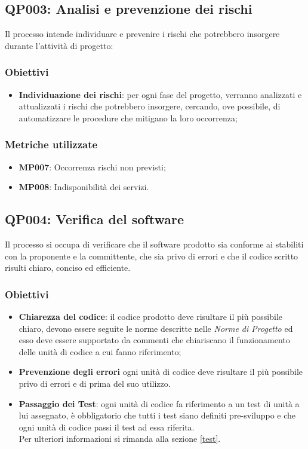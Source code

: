 \subsection{QP003: Analisi e prevenzione dei rischi}
Il processo intende individuare e prevenire i rischi che potrebbero insorgere durante l'attività di progetto:

\subsubsection{Obiettivi}
\begin{itemize}
	\item \textbf{Individuazione dei rischi}: per ogni fase del progetto, verranno analizzati e attualizzati i rischi che potrebbero insorgere, cercando, ove possibile, di automatizzare le procedure che mitigano la loro occorrenza;
\end{itemize}

\subsubsection{Metriche utilizzate}
\begin{itemize}	
	\item \textbf{MP007}: Occorrenza rischi non previsti;
	\item \textbf{MP008}: Indisponibilità dei servizi.
\end{itemize}
\subsection{QP004: Verifica del software}
Il processo si occupa di verificare che il software prodotto sia conforme ai  stabiliti con la proponente e la committente, che sia privo di errori e che il codice scritto risulti chiaro, conciso ed efficiente.
\subsubsection{Obiettivi}
\begin{itemize}
	\item \textbf{Chiarezza del codice}: il codice prodotto deve risultare il più possibile chiaro, devono essere seguite le norme descritte nelle \textit{Norme di Progetto} ed esso deve essere supportato da commenti che chiariscano il funzionamento delle unità di codice a cui fanno riferimento;
	\item \textbf{Prevenzione degli errori} ogni unità di codice deve risultare il più possibile privo di errori e di  prima del suo utilizzo.
	\item \textbf{Passaggio dei Test}: ogni unità di codice fa riferimento a un test di unità a lui assegnato, è obbligatorio che tutti i test siano definiti pre-sviluppo e che ogni unità di codice passi il test ad essa riferita.\\
	Per ulteriori informazioni si rimanda alla sezione \ref{test}.
\end{itemize}
